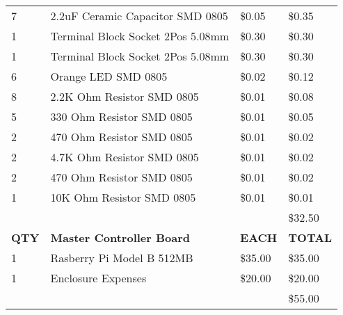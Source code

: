\begin{table}[h]
{\begin{tabular}{llll}
7            & 2.2uF Ceramic Capacitor SMD 0805                     & \$0.05        & \$0.35         \\
1            & Terminal Block Socket 2Pos 5.08mm                    & \$0.30        & \$0.30         \\
1            & Terminal Block Socket 2Pos 5.08mm                    & \$0.30        & \$0.30         \\
6            & Orange LED SMD 0805                                  & \$0.02        & \$0.12         \\
8            & 2.2K Ohm Resistor SMD 0805                           & \$0.01        & \$0.08         \\
5            & 330 Ohm Resistor SMD 0805                            & \$0.01        & \$0.05         \\
2            & 470 Ohm Resistor SMD 0805                            & \$0.01        & \$0.02         \\
2            & 4.7K Ohm Resistor SMD 0805                           & \$0.01        & \$0.02         \\
2            & 470 Ohm Resistor SMD 0805                            & \$0.01        & \$0.02         \\
1            & 10K Ohm Resistor SMD 0805                            & \$0.01        & \$0.01         \\
             &                                                      &               & \$32.50        \\  \hline \hline
\textbf{QTY} & \textbf{Master Controller Board}                     & \textbf{EACH} & \textbf{TOTAL} \\
1            & Rasberry Pi Model B 512MB                            & \$35.00       & \$35.00        \\
1            & Enclosure Expenses                                   & \$20.00       & \$20.00        \\
             &                                                      &               & \$55.00        \\  \hline
\end{tabular}}
\end{table}